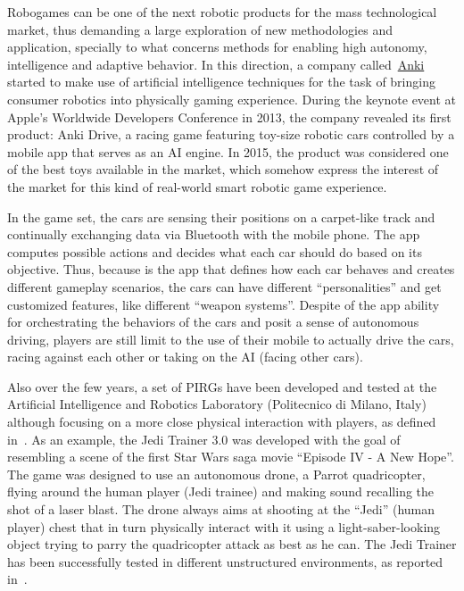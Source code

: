 Robogames can be one of the next robotic products for the mass technological market, thus demanding a large exploration of new methodologies and application, specially to what concerns methods for enabling high autonomy, intelligence and adaptive behavior. In this direction, a company called~\href{https://anki.com/en-us}{Anki} started to make use of artificial intelligence techniques for the task of bringing consumer robotics into physically gaming experience. During the keynote event at Apple's Worldwide Developers Conference in 2013, the company revealed its first product: Anki Drive, a racing game featuring toy-size robotic cars controlled by a mobile app that serves as an AI engine. In 2015, the product was considered one of the best toys available in the market, which somehow express the interest of the market for this kind of real-world smart robotic game experience. 

In the game set, the cars are sensing their positions on a carpet-like track and continually exchanging data via Bluetooth with the mobile phone. The app computes possible actions and decides what each car should do based on its objective. Thus, because is the app that defines how each car behaves and creates different gameplay scenarios, the cars can have different ``personalities'' and get customized features, like different ``weapon systems''. Despite of the app ability for orchestrating the behaviors of the cars and posit a sense of autonomous driving, players are still limit to the use of their mobile to actually drive the cars, racing against each other or taking on the AI (facing other cars).

Also over the few years, a set of PIRGs have been developed and tested at the Artificial Intelligence and Robotics Laboratory (Politecnico di Milano, Italy) although focusing on a more close physical interaction with players, as defined in~\cite{martinoia_physically_2013}. As an example, the Jedi Trainer 3.0 was developed with the goal of resembling a scene of the first Star Wars saga movie ``Episode IV - A New Hope''. The game was designed to use an autonomous drone, a Parrot quadricopter, flying around the human player (Jedi trainee) and making sound recalling the shot of a laser blast. The drone always aims at shooting at the ``Jedi'' (human player) chest that in turn physically interact with it using a light-saber-looking object trying to parry the quadricopter attack as best as he can. The Jedi Trainer has been successfully tested in different unstructured environments, as reported in~\cite{bonarini_timing_2014,martinoia_physically_2013}.

